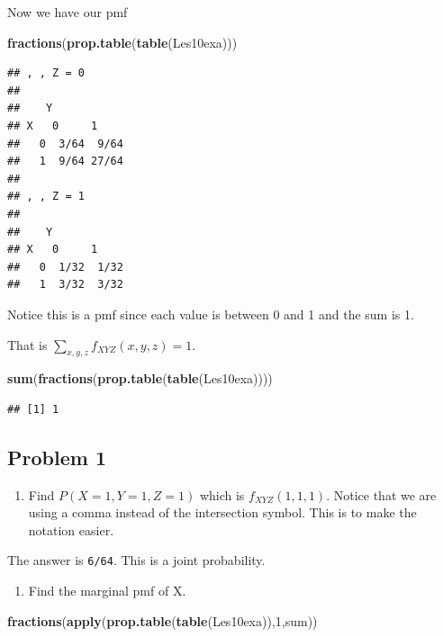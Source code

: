 \documentclass[]{book}
\newenvironment{Shaded}{\begin{snugshade}}{\end{snugshade}}
\newcommand{\KeywordTok}[1]{\textcolor[rgb]{0.13,0.29,0.53}{\textbf{#1}}}
\newcommand{\DecValTok}[1]{\textcolor[rgb]{0.00,0.00,0.81}{#1}}
\newcommand{\NormalTok}[1]{#1}
\providecommand{\tightlist}{%
  \setlength{\itemsep}{0pt}\setlength{\parskip}{0pt}}
\theoremstyle{definition}
\theoremstyle{definition}
\theoremstyle{definition}
\theoremstyle{remark}
\begin{document}
Now we have our pmf

\begin{Shaded}
\begin{Highlighting}[]
\KeywordTok{fractions}\NormalTok{(}\KeywordTok{prop.table}\NormalTok{(}\KeywordTok{table}\NormalTok{(Les10exa)))}
\end{Highlighting}
\end{Shaded}

\begin{verbatim}
## , , Z = 0
## 
##    Y
## X   0     1    
##   0  3/64  9/64
##   1  9/64 27/64
## 
## , , Z = 1
## 
##    Y
## X   0     1    
##   0  1/32  1/32
##   1  3/32  3/32
\end{verbatim}

Notice this is a pmf since each value is between 0 and 1 and the sum is
1.

That is \(\sum_{x,y,z}f_{XYZ}(x,y,z)=1\).

\begin{Shaded}
\begin{Highlighting}[]
\KeywordTok{sum}\NormalTok{(}\KeywordTok{fractions}\NormalTok{(}\KeywordTok{prop.table}\NormalTok{(}\KeywordTok{table}\NormalTok{(Les10exa))))}
\end{Highlighting}
\end{Shaded}

\begin{verbatim}
## [1] 1
\end{verbatim}

\subsection{Problem 1}\label{problem-1}

\begin{enumerate}
\def\labelenumi{\arabic{enumi}.}
\tightlist
\item
  Find \(P(X=1,Y=1,Z=1)\) which is \(f_{XYZ}(1,1,1)\). Notice that we
  are using a comma instead of the intersection symbol. This is to make
  the notation easier.
\end{enumerate}

The answer is \texttt{6/64}. This is a joint probability.

\begin{enumerate}
\def\labelenumi{\arabic{enumi}.}
\setcounter{enumi}{1}
\tightlist
\item
  Find the marginal pmf of X.
\end{enumerate}

\begin{Shaded}
\begin{Highlighting}[]
\KeywordTok{fractions}\NormalTok{(}\KeywordTok{apply}\NormalTok{(}\KeywordTok{prop.table}\NormalTok{(}\KeywordTok{table}\NormalTok{(Les10exa)),}\DecValTok{1}\NormalTok{,sum))}
\end{Highlighting}
\end{Shaded}
\end{document}

